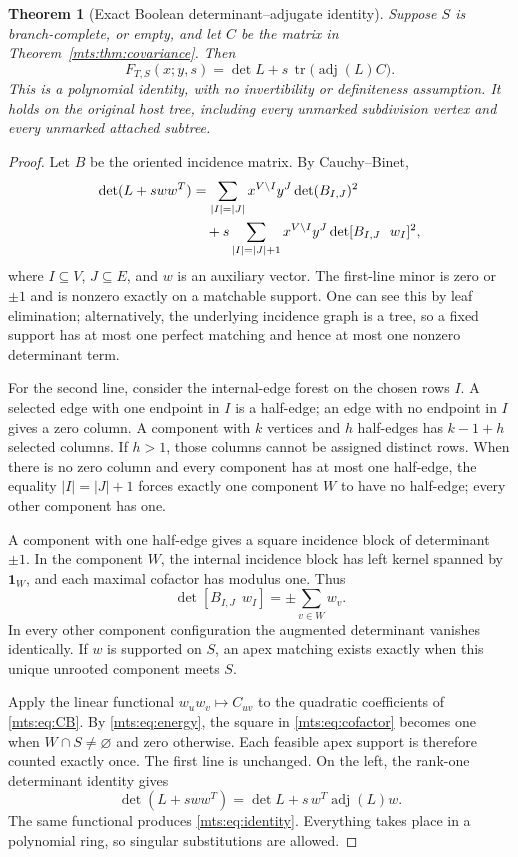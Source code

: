 \documentclass[11pt]{article}
\numberwithin{equation}{section}
\newtheorem{theorem}{Theorem}[section]
\theoremstyle{definition}
\newcommand{\one}{\mathbf 1}
\newcommand{\adj}{\operatorname{adj}}
\newcommand{\tr}{\operatorname{tr}}
\begin{document}
\begin{theorem}[Exact Boolean determinant--adjugate identity]\label{mts:thm:identity}
Suppose $S$ is branch-complete, or empty, and let $C$ be the matrix in
Theorem~\ref{mts:thm:covariance}. Then
\begin{equation}
 \boxed{F_{T,S}(x;y,s)=\det L+s\,\tr\bigl(\adj(L)C\bigr).}
 \label{mts:eq:identity}
\end{equation}
This is a polynomial identity, with no invertibility or definiteness
assumption. It holds on the original host tree, including every unmarked
subdivision vertex and every unmarked attached subtree.
\end{theorem}
\begin{proof}
Let $B$ be the oriented incidence matrix. By Cauchy--Binet,
\begin{align}
 \det(L+sww^T)
 &=\sum_{|I|=|J|}x^{V\setminus I}y^J\det(B_{I,J})^2\notag\\
 &\quad+s\sum_{|I|=|J|+1}x^{V\setminus I}y^J
                      \det[B_{I,J}\ \ w_I]^2,
 \label{mts:eq:CB}
\end{align}
where $I\subseteq V$, $J\subseteq E$, and $w$ is an auxiliary vector.
The first-line minor is zero or $\pm1$ and is nonzero exactly on a
matchable support. One can see this by leaf elimination; alternatively,
the underlying incidence graph is a tree, so a fixed support has at most
one perfect matching and hence at most one nonzero determinant term.

For the second line, consider the internal-edge forest on the chosen rows
$I$. A selected edge with one endpoint in $I$ is a half-edge; an edge
with no endpoint in $I$ gives a zero column. A component with $k$ vertices
and $h$ half-edges has $k-1+h$ selected columns. If $h>1$, those columns
cannot be assigned distinct rows. When there is no zero column and every
component has at most one half-edge, the equality $|I|=|J|+1$ forces exactly
one component $W$ to have no half-edge; every other component has one.

A component with one half-edge gives a square incidence block of
determinant $\pm1$. In the component $W$, the internal incidence block
has left kernel spanned by $\one_W$, and each maximal cofactor has modulus
one. Thus
\begin{equation}
 \det[B_{I,J}\ \ w_I]=\pm\sum_{v\in W}w_v.
 \label{mts:eq:cofactor}
\end{equation}
In every other component configuration the augmented determinant vanishes
identically. If $w$ is supported on $S$, an apex matching exists exactly
when this unique unrooted component meets $S$.

Apply the linear functional $w_uw_v\mapsto C_{uv}$ to the quadratic
coefficients of \eqref{mts:eq:CB}. By \eqref{mts:eq:energy}, the square in
\eqref{mts:eq:cofactor} becomes one when $W\cap S\ne\varnothing$ and zero
otherwise. Each feasible apex support is therefore counted exactly once.
The first line is unchanged. On the left, the rank-one determinant
identity gives
\[
 \det(L+sww^T)=\det L+s\,w^T\adj(L)w.
\]
The same functional produces \eqref{mts:eq:identity}. Everything takes place
in a polynomial ring, so singular substitutions are allowed.
\end{proof}
\end{document}
